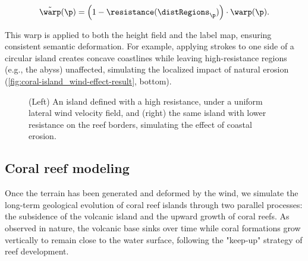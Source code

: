 \begin{align}
    \Tilde{\warp}(\p) = \left(1 - \resistance(\distRegions_\p) \right) \cdot \warp(\p).
\end{align}

This warp is applied to both the height field and the label map, ensuring consistent semantic deformation. For example, applying strokes to one side of a circular island creates concave coastlines while leaving high-resistance regions (e.g., the abyss) unaffected, simulating the localized impact of natural erosion (\cref{fig:coral-island_wind-effect-result}, bottom).

\begin{figure}
    \caption{(Left) An island defined with a high resistance, under a uniform lateral wind velocity field, and (right) the same island with lower resistance on the reef borders, simulating the effect of coastal erosion.}
    \label{fig:coral-island_resistance-result}
\end{figure}




\subsection{Coral reef modeling}
\label{sec:coral-island_coral-reef}

Once the terrain has been generated and deformed by the wind, we simulate the long-term geological evolution of coral reef islands through two parallel processes: the subsidence of the volcanic island and the upward growth of coral reefs. As observed in nature, the volcanic base sinks over time while coral formations grow vertically to remain close to the water surface, following the "keep-up" strategy of reef development.

